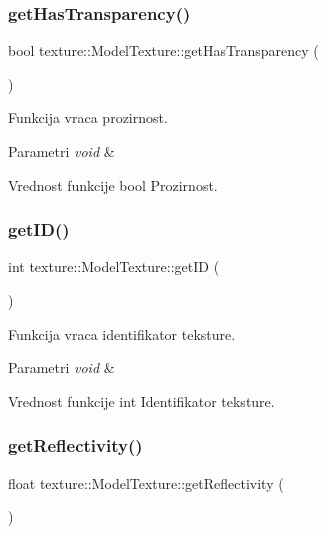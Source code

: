 \subsubsection{\texorpdfstring{get\+Has\+Transparency()}{getHasTransparency()}}
{\footnotesize\ttfamily bool texture\+::\+Model\+Texture\+::get\+Has\+Transparency (\begin{DoxyParamCaption}{ }\end{DoxyParamCaption})}



Funkcija vraca prozirnost. 


\begin{DoxyParams}{Parametri}
{\em void} & \\
\hline
\end{DoxyParams}
\begin{DoxyReturn}{Vrednost funkcije}
bool Prozirnost. 
\end{DoxyReturn}
\mbox{\label{classtexture_1_1ModelTexture_a3eeda8235d9c4cfccccc2ac805eeb864}} 
\subsubsection{\texorpdfstring{get\+I\+D()}{getID()}}
{\footnotesize\ttfamily int texture\+::\+Model\+Texture\+::get\+ID (\begin{DoxyParamCaption}{ }\end{DoxyParamCaption})}



Funkcija vraca identifikator teksture. 


\begin{DoxyParams}{Parametri}
{\em void} & \\
\hline
\end{DoxyParams}
\begin{DoxyReturn}{Vrednost funkcije}
int Identifikator teksture. 
\end{DoxyReturn}
\mbox{\label{classtexture_1_1ModelTexture_a613024c969ec176a1add0c20c3f98969}} 
\subsubsection{\texorpdfstring{get\+Reflectivity()}{getReflectivity()}}
{\footnotesize\ttfamily float texture\+::\+Model\+Texture\+::get\+Reflectivity (\begin{DoxyParamCaption}{ }\end{DoxyParamCaption})}



